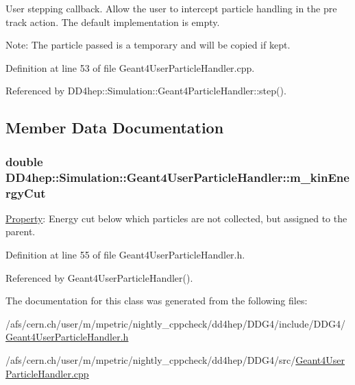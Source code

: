 User stepping callback. Allow the user to intercept particle handling in the pre track action. The default implementation is empty.

Note: The particle passed is a temporary and will be copied if kept. 

Definition at line 53 of file Geant4UserParticleHandler.cpp.

Referenced by DD4hep::Simulation::Geant4ParticleHandler::step().

\subsection{Member Data Documentation}
\hypertarget{class_d_d4hep_1_1_simulation_1_1_geant4_user_particle_handler_aaa82abebed535571499c3fa436f86a1b}{
\subsubsection[{m\_\-kinEnergyCut}]{\setlength{\rightskip}{0pt plus 5cm}double {\bf DD4hep::Simulation::Geant4UserParticleHandler::m\_\-kinEnergyCut}}}
\label{class_d_d4hep_1_1_simulation_1_1_geant4_user_particle_handler_aaa82abebed535571499c3fa436f86a1b}


\hyperlink{class_d_d4hep_1_1_property}{Property}: Energy cut below which particles are not collected, but assigned to the parent. 

Definition at line 55 of file Geant4UserParticleHandler.h.

Referenced by Geant4UserParticleHandler().

The documentation for this class was generated from the following files:\begin{DoxyCompactItemize}
\item 
/afs/cern.ch/user/m/mpetric/nightly\_\-cppcheck/dd4hep/DDG4/include/DDG4/\hyperlink{_geant4_user_particle_handler_8h}{Geant4UserParticleHandler.h}\item 
/afs/cern.ch/user/m/mpetric/nightly\_\-cppcheck/dd4hep/DDG4/src/\hyperlink{_geant4_user_particle_handler_8cpp}{Geant4UserParticleHandler.cpp}\end{DoxyCompactItemize}

